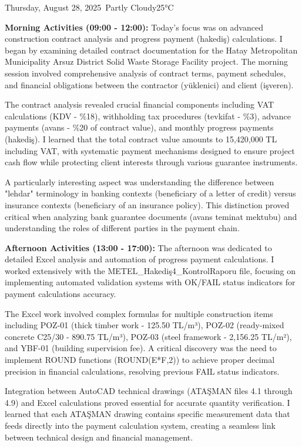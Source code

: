 \begin{dailyentry}{Thursday, August 28, 2025}{\weathercloudy\ Partly Cloudy}{25°C}

\begin{workcontent}
\textbf{Morning Activities (09:00 - 12:00):} Today's focus was on advanced construction contract analysis and progress payment (hakediş) calculations. I began by examining detailed contract documentation for the Hatay Metropolitan Municipality Arsuz District Solid Waste Storage Facility project. The morning session involved comprehensive analysis of contract terms, payment schedules, and financial obligations between the contractor (yüklenici) and client (işveren).

The contract analysis revealed crucial financial components including VAT calculations (KDV - \%18), withholding tax procedures (tevkifat - \%3), advance payments (avans - \%20 of contract value), and monthly progress payments (hakediş). I learned that the total contract value amounts to 15,420,000 TL including VAT, with systematic payment mechanisms designed to ensure project cash flow while protecting client interests through various guarantee instruments.

A particularly interesting aspect was understanding the difference between "lehdar" terminology in banking contexts (beneficiary of a letter of credit) versus insurance contexts (beneficiary of an insurance policy). This distinction proved critical when analyzing bank guarantee documents (avans teminat mektubu) and understanding the roles of different parties in the payment chain.

\textbf{Afternoon Activities (13:00 - 17:00):} The afternoon was dedicated to detailed Excel analysis and automation of progress payment calculations. I worked extensively with the METEL\_Hakediş4\_KontrolRaporu file, focusing on implementing automated validation systems with OK/FAIL status indicators for payment calculations accuracy.

The Excel work involved complex formulas for multiple construction items including POZ-01 (thick timber work - 125.50 TL/m³), POZ-02 (ready-mixed concrete C25/30 - 890.75 TL/m³), POZ-03 (steel framework - 2,156.25 TL/m²), and YBF-01 (building supervision fee). A critical discovery was the need to implement ROUND functions (ROUND(E*F,2)) to achieve proper decimal precision in financial calculations, resolving previous FAIL status indicators.

Integration between AutoCAD technical drawings (ATAŞMAN files 4.1 through 4.9) and Excel calculations proved essential for accurate quantity verification. I learned that each ATAŞMAN drawing contains specific measurement data that feeds directly into the payment calculation system, creating a seamless link between technical design and financial management.


\end{workcontent}
\end{dailyentry}
